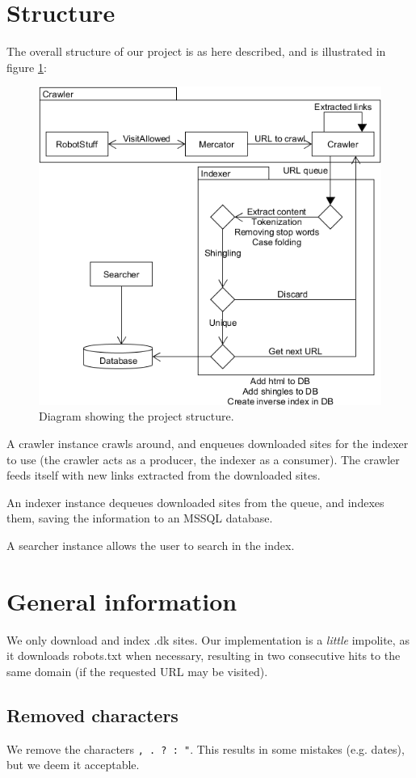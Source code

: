 \section{Structure}
The overall structure of our project is as here described, and is illustrated in figure \ref{fig:structure}:
\begin{figure}[h]
    \includegraphics[width=\textwidth]{diagrams/structure}
    \caption{Diagram showing the project structure.}
    \label{fig:structure}
\end{figure}

A crawler instance crawls around, and enqueues downloaded sites for the indexer to use (the crawler acts as a producer, the indexer as a consumer). The crawler feeds itself with new links extracted from the downloaded sites.

An indexer instance dequeues downloaded sites from the queue, and indexes them, saving the information to an MSSQL database.

A searcher instance allows the user to search in the index.

\section{General information}\label{sec:rem-chars}
We only download and index .dk sites. Our implementation is a \emph{little} impolite, as it downloads robots.txt when necessary, resulting in two consecutive hits to the same domain (if the requested URL may be visited).

\subsection{Removed characters}
We remove the characters \texttt{, . ? : "}. This results in some mistakes (e.g. dates), but we deem it acceptable.